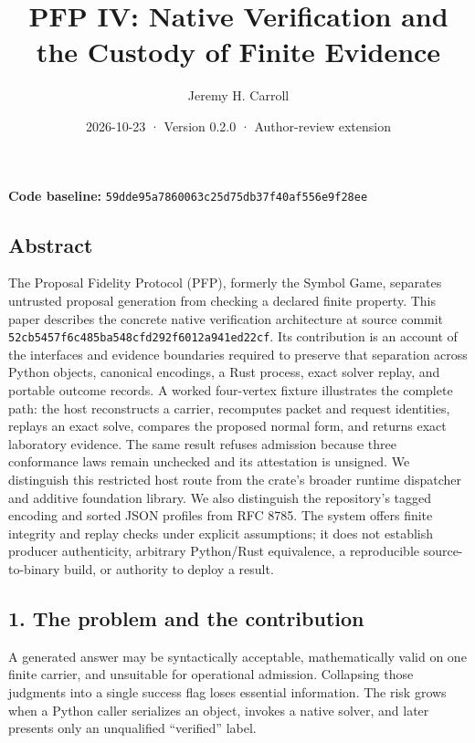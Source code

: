 \documentclass[
  11pt,
]{article}
\title{PFP IV: Native Verification and the Custody of Finite Evidence}
\author{Jeremy H. Carroll}
\date{2026-10-23 · Version 0.2.0 · Author-review extension}
\begin{document}
\makeatletter
\begin{center}
{\LARGE \@title\par}
\vspace{0.8em}
{\normalsize \@author\par}
\vspace{0.5em}
{\small \@date\par}
\end{center}
\makeatother

\textbf{Code baseline:}
\nolinkurl{59dde95a7860063c25d75db37f40af556e9f28ee}

\subsection{Abstract}\label{abstract}

The Proposal Fidelity Protocol (PFP), formerly the Symbol Game,
separates untrusted proposal generation from checking a declared finite
property. This paper describes the concrete native verification
architecture at source commit
\nolinkurl{52cb5457f6c485ba548cfd292f6012a941ed22cf}. Its contribution
is an account of the interfaces and evidence boundaries required to
preserve that separation across Python objects, canonical encodings, a
Rust process, exact solver replay, and portable outcome records. A
worked four-vertex fixture illustrates the complete path: the host
reconstructs a carrier, recomputes packet and request identities,
replays an exact solve, compares the proposed normal form, and returns
exact laboratory evidence. The same result refuses admission because
three conformance laws remain unchecked and its attestation is unsigned.
We distinguish this restricted host route from the crate's broader
runtime dispatcher and additive foundation library. We also distinguish
the repository's tagged encoding and sorted JSON profiles from RFC 8785.
The system offers finite integrity and replay checks under explicit
assumptions; it does not establish producer authenticity, arbitrary
Python/Rust equivalence, a reproducible source-to-binary build, or
authority to deploy a result.

\subsection{1. The problem and the
contribution}\label{the-problem-and-the-contribution}

A generated answer may be syntactically acceptable, mathematically valid
on one finite carrier, and unsuitable for operational admission.
Collapsing those judgments into a single success flag loses essential
information. The risk grows when a Python caller serializes an object,
invokes a native solver, and later presents only an unqualified
``verified'' label.
\end{document}
